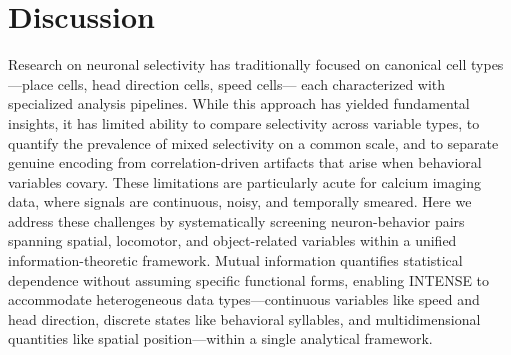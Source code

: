 \section{Discussion}
\label{sec:discussion}

Research on neuronal selectivity has traditionally focused on canonical cell types---place cells, head direction cells, speed cells--- each characterized with specialized analysis pipelines. While this approach has yielded fundamental insights, it has limited ability to compare selectivity across variable types, to quantify the prevalence of mixed selectivity on a common scale, and to separate genuine encoding from correlation-driven artifacts that arise when behavioral variables covary. These limitations are particularly acute for calcium imaging data, where signals are continuous, noisy, and temporally smeared. Here we address these challenges by systematically screening neuron-behavior pairs spanning spatial, locomotor, and object-related variables within a unified information-theoretic framework. Mutual information quantifies statistical dependence without assuming specific functional forms, enabling INTENSE to accommodate heterogeneous data types---continuous variables like speed and head direction, discrete states like behavioral syllables, and multidimensional quantities like spatial position---within a single analytical framework. 


